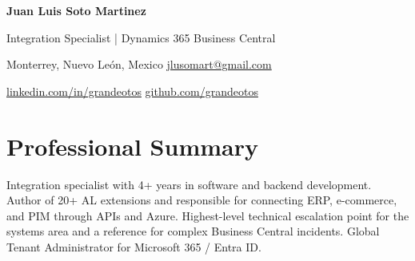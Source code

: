 \documentclass[10pt,letterpaper]{article}
\begin{document}
\begingroup\centering
{\fontsize{18}{21}\selectfont\bfseries Juan Luis Soto Martinez}\par
{\normalsize Integration Specialist | Dynamics 365 Business Central}\par
Monterrey, Nuevo León, Mexico \enspace\textbar\enspace \href{mailto:jlusomart@gmail.com}{jlusomart@gmail.com}\par
\href{https://linkedin.com/in/grandeotos}{linkedin.com/in/grandeotos} \enspace\textbar\enspace
\href{https://github.com/grandeotos}{github.com/grandeotos}\par\endgroup

\section{Professional Summary}
Integration specialist with 4+ years in software and backend development. Author of 20+ AL extensions and responsible for connecting ERP, e-commerce, and PIM through APIs and Azure. Highest-level technical escalation point for the systems area and a reference for complex Business Central incidents. Global Tenant Administrator for Microsoft 365 / Entra ID.
\end{document}
